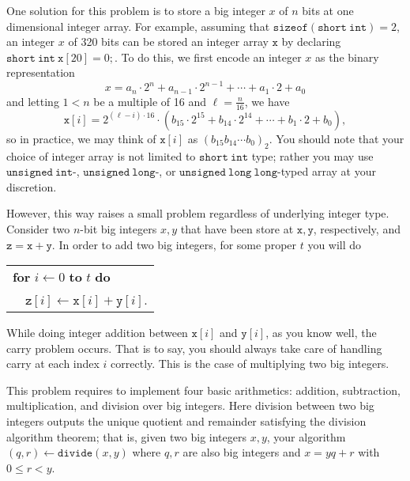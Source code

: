 \documentclass{article}
\begin{document}
One solution for this problem is to store a big integer $x$ of $n$ bits at one dimensional integer array.
For example, assuming that $\mathtt{sizeof(short\ int)}=2$, an integer $x$ of 320 bits can be stored an integer array $\mathtt{x}$ by declaring
$\mathtt{short\ int}\ \mathtt{x}[20]={0};$. To do this, we first encode an integer $x$ as the binary representation 
\begin{equation*}
x=a_n\cdot 2^n+a_{n-1}\cdot 2^{n-1}+\cdots+a_1\cdot 2+a_0
\end{equation*}
and letting $1<n$ be a multiple of 16 and $\ell=\frac{n}{16}$, we have 
\begin{equation*}
\mathtt{x}[i]=2^{(\ell-i)\cdot 16}\cdot \left(b_{15}\cdot 2^{15}+b_{14}\cdot 2^{14}+\cdots+b_1\cdot 2+b_0\right),
\end{equation*}
so in practice, we may think of $\mathtt{x}[i]$ as $(b_{15}b_{14}\cdots b_0)_2$.
You should note that your choice of integer array is not limited to $\mathtt{short\ int}$ type; 
rather you may use $\mathtt{unsigned\ int}$-, $\mathtt{unsigned\ long}$-, or $\mathtt{unsigned\ long\ long}$-typed array at your discretion.


However, this way raises a small problem regardless of underlying integer type.  Consider two $n$-bit big integers $x,y$ that have been store at $\mathtt{x},\mathtt{y}$, respectively, 
and $\mathtt{z}=\mathtt{x}+\mathtt{y}$. In order to add two big integers, for some proper $t$ you will do 
\begin{table}[h]
\centering
\begin{tabular}{llll}
\multicolumn{4}{l}{\textbf{for} $i\gets 0$ \textbf{to} $t$ \textbf{do}}\\
 & \multicolumn{3}{l}{$\mathtt{z}[i]\gets \mathtt{x}[i]+\mathtt{y}[i]$.}
\end{tabular}
\end{table}

\noindent While doing integer addition between $\mathtt{x}[i]$ and $\mathtt{y}[i]$, as you know well, the carry problem occurs. 
That is to say, you should always take care of handling carry at each index $i$ correctly.
This is the case of multiplying two big integers.

This problem requires to implement four basic arithmetics: addition, subtraction, multiplication, and division over big integers.
Here division between two big integers outputs the unique quotient and remainder satisfying the division algorithm theorem; that is,
given two big integers $x,y$, your algorithm $(q,r)\gets\mathtt{divide}(x,y)$ where $q,r$ are also big integers and 
$x=yq+r$ with $0\leq r<y$.
\end{document}
